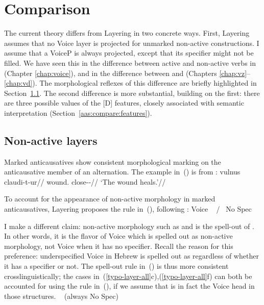 \section{Comparison} \label{aas:compare}
The current theory differs from Layering in two concrete ways. First, Layering assumes that no Voice layer is projected for unmarked non-active constructions. I assume that a VoiceP is always projected, except that its specifier might not be filled. We have seen this in the difference between active and non-active verbs in {\tkal} (Chapter \ref{chap:voice}), and in the difference between {\vz} and {\vd} (Chapters \ref{chap:vz}--\ref{chap:vd}). The morphological reflexes of this difference are briefly highlighted in Section~\ref{aas:compare:vi-nact}. The second difference  is more substantial, building on the first: there are three possible values of the [D] features, closely associated with semantic interpretation (Section~\ref{aas:compare:features}).

	\subsection{Non-active layers} \label{aas:compare:vi-nact}
Marked anticausatives show consistent morphological marking on the anticausative member of an alternation. The example in~(\nextx) is from \citet[662]{kastnerzu17}:
\ex \begingl
	\gla vulnus claudi-t-ur//
	\glb wound. close--//
	\glft `The wound heals.'//
	\endgl
\xe

To account for the appearance of non-active morphology in marked anticausatives, Layering proposes the rule in~(\nextx), following \cite{embick04}:
\ex\label{ex:aas:vi-nact}Voice \lra~ / \trace~No Spec
\xe

I make a different claim: non-active morphology such as  and {\tnif} is the spell-out of {\vz}. In other words, it is the flavor of Voice which is spelled out as non-active morphology, not Voice when it has no specifier. Recall the reason for this preference: underspecified Voice in Hebrew is spelled out as {\tkal} regardless of whether it has a specifier or not. The spell-out rule in~(\nextx) is thus more consistent crosslinguistically; the cases in~(\ref{typo-layer-all}c),(\ref{typo-layer-all}f) can both be accounted for using the rule in~(\lastx), if we assume that {\vz} is in fact the Voice head in those structures.
\ex {\vz} \lra~ \hfill (always No Spec)
\xe

